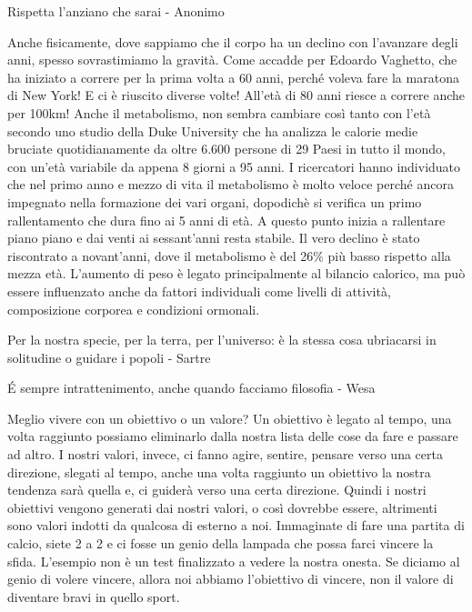 \documentclass[12pt]{book} %
\begin{document}
\begin{mdframed}[linewidth=1pt]
Rispetta l'anziano che sarai - Anonimo

Anche fisicamente, dove sappiamo che il corpo ha un declino con l'avanzare degli anni, spesso
sovrastimiamo la gravità. Come accadde per Edoardo
Vaghetto, che ha iniziato a correre per la prima volta a 60 anni, perché voleva fare la maratona di New York! E ci è riuscito
diverse volte! All'età di 80 anni riesce a correre anche per 100km! Anche il metabolismo, non
sembra cambiare così tanto con l'età secondo uno studio della Duke
University che ha analizza le calorie medie bruciate
quotidianamente da oltre 6.600 persone di 29 Paesi in tutto il mondo, con un'età variabile da appena 8 giorni a 95
anni. I ricercatori hanno individuato che nel primo anno e mezzo di vita il metabolismo è molto veloce perché ancora
impegnato nella formazione dei vari organi, dopodichè si verifica un primo rallentamento che dura fino ai 5 anni di
età. A questo punto inizia a rallentare piano piano e dai venti ai sessant'anni resta stabile. 
Il vero declino è stato riscontrato a novant'anni, dove il metabolismo è del 26\% più basso
rispetto alla mezza età. L’aumento di peso è legato principalmente al bilancio calorico, ma può essere influenzato anche da fattori individuali come livelli di attività, composizione corporea e condizioni ormonali.
\end{mdframed}

Per la nostra specie, per la terra, per l'universo: è la stessa cosa ubriacarsi in solitudine o guidare i popoli - Sartre 

É sempre intrattenimento, anche quando facciamo filosofia - Wesa

Meglio vivere con un obiettivo o un valore?
Un obiettivo è legato al tempo, una volta raggiunto possiamo eliminarlo dalla nostra lista delle cose da fare e passare
ad altro. I nostri valori, invece, ci fanno agire, sentire, pensare verso una certa direzione, slegati al tempo, anche
una volta raggiunto un obiettivo la nostra tendenza sarà quella e, ci guiderà verso una certa direzione.
Quindi i nostri obiettivi vengono generati dai nostri valori, o così dovrebbe essere, altrimenti sono valori indotti da
qualcosa di esterno a noi. Immaginate di fare una partita di calcio, siete 2 a 2 e ci fosse un genio della lampada che
possa farci vincere la sfida. L'esempio non è un test finalizzato a vedere la nostra onesta. Se diciamo al genio di
volere vincere, allora noi abbiamo l'obiettivo di vincere, non il valore di diventare bravi in quello sport.
\end{document}
